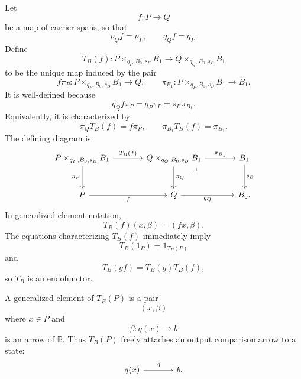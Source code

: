\begin{definition}
    Let
    \[
        f:P\to Q
    \]
    be a map of carrier spans, so that
    \[
        p_Qf=p_P,
        \qquad
        q_Qf=q_P.
    \]
    Define
    \[
        T_B(f):
        P\times_{q_P,B_0,s_B}B_1
        \longrightarrow
        Q\times_{q_Q,B_0,s_B}B_1
    \]
    to be the unique map induced by the pair
    \[
        f\pi_P:
        P\times_{q_P,B_0,s_B}B_1\to Q,
        \qquad
        \pi_{B_1}:
        P\times_{q_P,B_0,s_B}B_1\to B_1.
    \]
    It is well-defined because
    \[
        q_Qf\pi_P
        =
        q_P\pi_P
        =
        s_B\pi_{B_1}.
    \]
    Equivalently, it is characterized by
    \[
        \pi_QT_B(f)=f\pi_P,
        \qquad
        \pi_{B_1}T_B(f)=\pi_{B_1}.
    \]
    The defining diagram is
    \[
        \begin{tikzcd}[column sep=large, row sep=large]
                P\times_{q_P,B_0,s_B}B_1
                    \arrow[r, "{T_B(f)}"]
                    \arrow[d, "\pi_P"']
            &
                Q\times_{q_Q,B_0,s_B}B_1
                    \arrow[r, "\pi_{B_1}"]
                    \arrow[d, "\pi_Q"]
                    \arrow[dr, phantom, "\lrcorner", very near start]
            &
                B_1
                    \arrow[d, "s_B"]
            \\
                P
                    \arrow[r, "f"']
            &
                Q
                    \arrow[r, "q_Q"']
            &
                B_0.
        \end{tikzcd}
    \]
    In generalized-element notation,
    \[
        T_B(f)(x,\beta)=(fx,\beta).
    \]
    The equations characterizing \(T_B(f)\) immediately imply
    \[
        T_B(1_P)=1_{T_B(P)}
    \]
    and
    \[
        T_B(gf)=T_B(g)T_B(f),
    \]
    so \(T_B\) is an endofunctor.
\end{definition}

A generalized element of \(T_B(P)\) is a pair
\[
    (x,\beta)
\]
where \(x\in P\) and
\[
    \beta:q(x)\to b
\]
is an arrow of \(\mathbb B\). Thus \(T_B(P)\) freely attaches an output comparison arrow to a state:
\[
    \begin{tikzcd}[column sep=large]
            q(x) 
                \arrow[r, "\beta"] 
        & 
            b.
    \end{tikzcd}
\]

